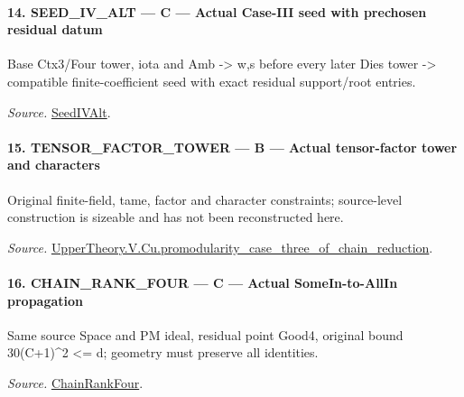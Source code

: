 \paragraph{14. SEED\_\allowbreak IV\_\allowbreak ALT — C — Actual Case-III seed with prechosen residual datum}

Base Ctx3/Four tower, iota and Amb -> w,s before every later Dies tower -> compatible finite-coefficient seed with exact residual support/root entries.

\emph{Source.} \href{https://github.com/CocoSgt/riemann-hypothesis-lean/blob/7cbf7a0c32fca1badf05931879a37c3f8a2b03b4/src/Development/AutomorphicArithmetic/AutomorphicVarieties/ModularityArgument/ThresholdArguments/DenseThresholdCases/PromodularityCaseThree.lean#L19-L25}{SeedIVAlt}.



\paragraph{15. TENSOR\_\allowbreak FACTOR\_\allowbreak TOWER — B — Actual tensor-factor tower and characters}

Original finite-field, tame, factor and character constraints; source-level construction is sizeable and has not been reconstructed here.

\emph{Source.} \href{https://github.com/CocoSgt/riemann-hypothesis-lean/blob/7cbf7a0c32fca1badf05931879a37c3f8a2b03b4/src/Development/AutomorphicArithmetic/AutomorphicVarieties/ModularityArgument/ThresholdArguments/DenseThresholdCases/PromodularityCaseThreeOfLemmas.lean#L131-L153}{UpperTheory.V.Cu.promodularity\_\allowbreak case\_\allowbreak three\_\allowbreak of\_\allowbreak chain\_\allowbreak reduction}.



\paragraph{16. CHAIN\_\allowbreak RANK\_\allowbreak FOUR — C — Actual SomeIn-to-AllIn propagation}

Same source Space and PM ideal, residual point Good4, original bound 30(C+1)\textasciicircum{}2 <= d; geometry must preserve all identities.

\emph{Source.} \href{https://github.com/CocoSgt/riemann-hypothesis-lean/blob/7cbf7a0c32fca1badf05931879a37c3f8a2b03b4/src/Development/AutomorphicArithmetic/AutomorphicVarieties/ModularityArgument/ThresholdArguments/DenseThresholdCases/PromodularityCaseThree.lean#L26-L32}{ChainRankFour}.



